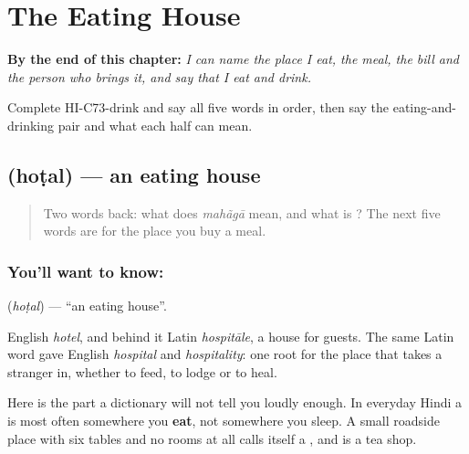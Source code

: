 
\chapter{The Eating House}
\label{ch:hi-the-eating-house}

\begin{chapteropening}
\textbf{By the end of this chapter:} \emph{I can name the place I eat, the meal, the bill and the person who brings it, and say that I eat and drink.}

Complete HI-C73-drink and say all five words in order, then say the eating-and-drinking pair and what each half can mean.
\end{chapteropening}

\section[hoṭal]{ (hoṭal) — an eating house}

\label{lesson:HI-C73-eating-house}



\begin{quote}
Two words back: what does \emph{mahãgā} mean, and what is \textbf{}? The next five words are for the place you buy a meal.
\end{quote}

\subsection*{You'll want to know: }
\textbf{} (\emph{hoṭal}) — \textquotedblleft{}an eating house\textquotedblright{}.

English \emph{hotel}, and behind it Latin \emph{hospitāle}, a house for guests. The same Latin word gave English \emph{hospital} and \emph{hospitality}: one root for the place that takes a stranger in, whether to feed, to lodge or to heal.

Here is the part a dictionary will not tell you loudly enough. In everyday Hindi a  is most often somewhere you \textbf{eat}, not somewhere you sleep. A small roadside place with six tables and no rooms at all calls itself a , and \textbf{ } is a tea shop.

